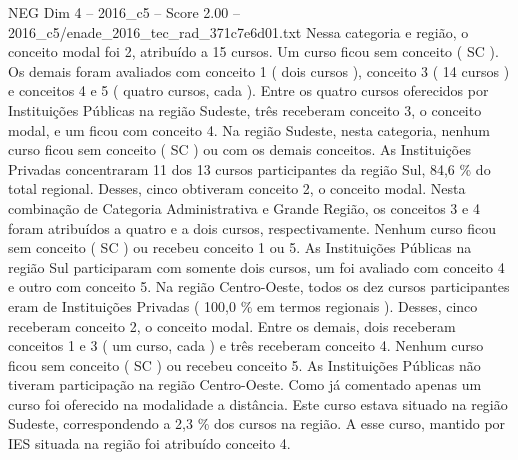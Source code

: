 \begin{textsample}{NEG Dim 4 – 2016\_c5 – Score 2.00 – 2016\_c5/enade\_2016\_tec\_rad\_371c7e6d01.txt}
Nessa categoria e região, o conceito modal foi 2, atribuído a 15 cursos.
Um curso ficou sem conceito ( SC ).
Os demais foram avaliados com conceito 1 ( dois cursos ), conceito 3 ( 14 cursos ) e conceitos 4 e 5 ( quatro cursos, cada ).
Entre os quatro cursos oferecidos por Instituições Públicas na região Sudeste, três receberam conceito 3, o conceito modal, e um ficou com conceito 4.
Na região Sudeste, nesta categoria, nenhum curso ficou sem conceito ( SC ) ou com os demais conceitos.
As Instituições Privadas concentraram 11 dos 13 cursos participantes da região Sul, 84,6 \% do total regional.
Desses, cinco obtiveram conceito 2, o conceito modal.
Nesta combinação de Categoria Administrativa e Grande Região, os conceitos 3 e 4 foram atribuídos a quatro e a dois cursos, respectivamente.
Nenhum curso ficou sem conceito ( SC ) ou recebeu conceito 1 ou 5.
As Instituições Públicas na região Sul participaram com somente dois cursos, um foi avaliado com conceito 4 e outro com conceito 5.
Na região Centro-Oeste, todos os dez cursos participantes eram de Instituições Privadas ( 100,0 \% em termos regionais ).
Desses, cinco receberam conceito 2, o conceito modal.
Entre os demais, dois receberam conceitos 1 e 3 ( um curso, cada ) e três receberam conceito 4.
Nenhum curso ficou sem conceito ( SC ) ou recebeu conceito 5.
As Instituições Públicas não tiveram participação na região Centro-Oeste.
Como já comentado apenas um curso foi oferecido na modalidade a distância.
Este curso estava situado na região Sudeste, correspondendo a 2,3 \% dos cursos na região.
A esse curso, mantido por IES situada na região foi atribuído conceito 4.

\end{textsample}
